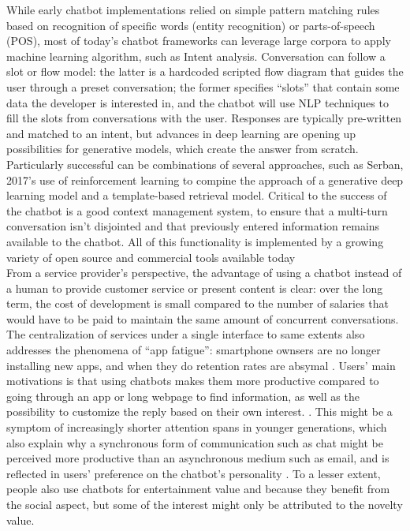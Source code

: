 While early chatbot implementations relied on simple pattern matching rules based on recognition of specific words (entity recognition) or parts-of-speech (POS), most of today's chatbot frameworks can leverage large corpora to apply machine learning algorithm, such as Intent analysis. Conversation can follow a slot or flow model: the latter is a hardcoded scripted flow diagram that guides the user through a preset conversation; the former specifies ``slots'' that contain some data the developer is interested in, and the chatbot will use NLP techniques to fill the slots from conversations with the user. Responses are typically pre-written and matched to an intent, but advances in deep learning are opening up possibilities for generative models, which create the answer from scratch\cite{Gregori}. Particularly successful can be combinations of several approaches, such as Serban, 2017's use of reinforcement learning to compine the approach of a generative deep learning model and a template-based retrieval model\cite{Serban2017}. Critical to the success of the chatbot is a good context management system, to ensure that a multi-turn conversation isn't disjointed and that previously entered information remains available to the chatbot. All of this functionality is implemented by a growing variety of open source and commercial tools available today \cite{JavierCouto}\\
From a service provider's perspective, the advantage of using a chatbot instead of a human to provide customer service or present content is clear: over the long term, the cost of development is small compared to the number of salaries that would have to be paid to maintain the same amount of concurrent conversations. The centralization of services under a single interface to same extents also addresses the phenomena of ``app fatigue'': smartphone ownsers are no longer installing new apps, and when they do retention rates are absymal \cite{appfatigue}. Users' main motivations is that using chatbots makes them more productive compared to going through an app or long webpage to find information, as well as the possibility to customize the reply based on their own interest. \cite{10.1007/978-3-319-70284-1_30}. This might be a symptom of increasingly shorter attention spans in younger generations\cite{Wilmer2017}, which also explain why a synchronous form of communication such as chat might be perceived more productive than an asynchronous medium such as email, and is reflected in users' preference on the chatbot's personality \cite{10.1007/978-3-319-67744-6_28}. To a lesser extent, people also use chatbots for entertainment value and because they benefit from the social aspect, but some of the interest might only be attributed to the novelty value. \\
